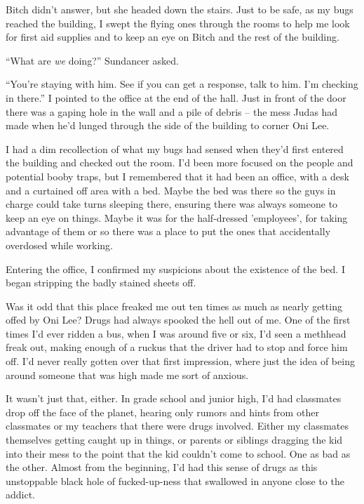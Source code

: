 Bitch didn't answer, but she headed down the stairs.  Just to be safe, as my bugs reached the building, I swept the flying ones through the rooms to help me look for first aid supplies and to keep an eye on Bitch and the rest of the building.



``What are \emph{we} doing?'' Sundancer asked.



``You're staying with him.  See if you can get a response, talk to him.  I'm checking in there.''  I pointed to the office at the end of the hall.  Just in front of the door there was a gaping hole in the wall and a pile of debris – the mess Judas had made when he'd lunged through the side of the building to corner Oni Lee.



I had a dim recollection of what my bugs had sensed when they'd first entered the building and checked out the room.  I'd been more focused on the people and potential booby traps, but I remembered that it had been an office, with a desk and a curtained off area with a bed.  Maybe the bed was there so the guys in charge could take turns sleeping there, ensuring there was always someone to keep an eye on things.  Maybe it was for the half-dressed 'employees', for taking advantage of them or so there was a place to put the ones that accidentally overdosed while working.



Entering the office, I confirmed my suspicions about the existence of the bed.  I began stripping the badly stained sheets off.



Was it odd that this place freaked me out ten times as much as nearly getting offed by Oni Lee?  Drugs had always spooked the hell out of me.  One of the first times I'd ever ridden a bus, when I was around five or six, I'd seen a methhead freak out, making enough of a ruckus that the driver had to stop and force him off.  I'd never really gotten over that first impression, where just the idea of being around someone that was high made me sort of anxious.



It wasn't just that, either.  In grade school and junior high, I'd had classmates drop off the face of the planet, hearing only rumors and hints from other classmates or my teachers that there were drugs involved.  Either my classmates themselves getting caught up in things, or parents or siblings dragging the kid into their mess to the point that the kid couldn't come to school.  One as bad as the other.  Almost from the beginning, I'd had this sense of drugs as this unstoppable black hole of fucked-up-ness that swallowed in anyone close to the addict.



